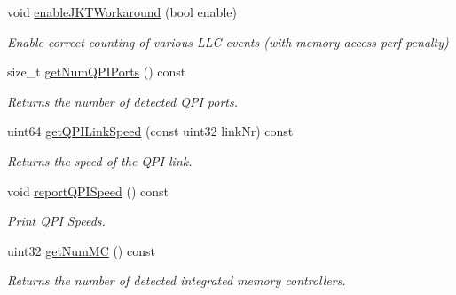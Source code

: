 \begin{DoxyCompactItemize}
\mbox{\label{class_server_p_c_i_c_f_g_uncore_a91352764d2ab70889388f61d48852694}} 
void \mbox{\hyperlink{class_server_p_c_i_c_f_g_uncore_a91352764d2ab70889388f61d48852694}{enable\+J\+K\+T\+Workaround}} (bool enable)
\begin{DoxyCompactList}\small\item\em Enable correct counting of various L\+LC events (with memory access perf penalty) \end{DoxyCompactList}\item 
\mbox{\label{class_server_p_c_i_c_f_g_uncore_a5dc6e057441bbbbc3d396fe8e5d7cc2f}} 
size\+\_\+t \mbox{\hyperlink{class_server_p_c_i_c_f_g_uncore_a5dc6e057441bbbbc3d396fe8e5d7cc2f}{get\+Num\+Q\+P\+I\+Ports}} () const
\begin{DoxyCompactList}\small\item\em Returns the number of detected Q\+PI ports. \end{DoxyCompactList}\item 
\mbox{\label{class_server_p_c_i_c_f_g_uncore_ae3421871d5942f1835af1fe4c282950b}} 
uint64 \mbox{\hyperlink{class_server_p_c_i_c_f_g_uncore_ae3421871d5942f1835af1fe4c282950b}{get\+Q\+P\+I\+Link\+Speed}} (const uint32 link\+Nr) const
\begin{DoxyCompactList}\small\item\em Returns the speed of the Q\+PI link. \end{DoxyCompactList}\item 
\mbox{\label{class_server_p_c_i_c_f_g_uncore_ab41eec236180d9d451fc1edc823dcc84}} 
void \mbox{\hyperlink{class_server_p_c_i_c_f_g_uncore_ab41eec236180d9d451fc1edc823dcc84}{report\+Q\+P\+I\+Speed}} () const
\begin{DoxyCompactList}\small\item\em Print Q\+PI Speeds. \end{DoxyCompactList}\item 
\mbox{\label{class_server_p_c_i_c_f_g_uncore_a70765cb7dc2f54fae3528e6f15c57f45}} 
uint32 \mbox{\hyperlink{class_server_p_c_i_c_f_g_uncore_a70765cb7dc2f54fae3528e6f15c57f45}{get\+Num\+MC}} () const
\begin{DoxyCompactList}\small\item\em Returns the number of detected integrated memory controllers. \end{DoxyCompactList}\item 

\end{DoxyCompactItemize}

